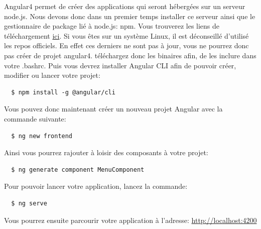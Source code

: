 \documentclass{article}
\begin{document}
  Angular4 permet de créer des applications qui seront hébergées sur un serveur node.js.
  Nous devons donc dans un premier temps installer ce serveur ainsi que le gestionnaire
  de package lié à node.js: npm. Vous trouverez les liens de téléchargement 
  \href{https://nodejs.org/en/download/}{ici}. Si vous êtes sur un système Linux,
  il est déconseillé d'utilisé les repos officiels. En effet ces derniers ne sont pas à jour,
  vous ne pourrez donc pas créer de projet angular4. téléchargez donc les binaires afin,
  de les inclure dans votre .bashrc. Puis vous devrez installer
  Angular CLI afin de pouvoir créer, modifier ou lancer votre projet:
  \begin{lstlisting}
  $ npm install -g @angular/cli
  \end{lstlisting}
  Vous pouvez donc maintenant créer un nouveau projet Angular avec la commande suivante:
  \begin{lstlisting}
  $ ng new frontend
  \end{lstlisting}
  Ainsi vous pourrez rajouter à loisir des composants à votre projet:
  \begin{lstlisting}
  $ ng generate component MenuComponent
  \end{lstlisting}
  Pour pouvoir lancer votre application, lancez la commande:
  \begin{lstlisting}
  $ ng serve
  \end{lstlisting}
  Vous pourrez ensuite parcourir votre application à l'adresse: \href{http://localhost:4200}{http://localhost:4200}
\end{document}
